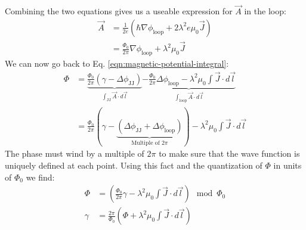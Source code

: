 Combining the two equations gives us a useable expression for $\vec{A}$ in the loop:
\begin{align}
	\vec{A} &= \frac{1}{2e}\left(\hbar \nabla \phi_{\text{loop}} + 2\lambda^2e\mu_0\vec{J} \right) \nonumber \\
	&= \frac{\Phi_0}{2\pi} \nabla \phi_{\text{loop}} + \lambda^2\mu_0\vec{J}
\end{align}
We can now go back to Eq. \ref{eqn:magnetic-potential-integral}:
\begin{align}
	\Phi &= \underbrace{\frac{\Phi_0}{2\pi} \left(\gamma - \Delta\phi_{\text{JJ}}\right)}_{\int_{\text{JJ}}\vec{A} \cdot d\vec{l}} \underbrace{- \frac{\Phi_0}{2\pi}\Delta \phi_{\text{loop}} - \lambda^2\mu_0 \int \vec{J}\cdot d \vec{l}}_{\int_{\text{loop}}\vec{A}\cdot d\vec{l}} \nonumber \\
	&= \frac{\Phi_0}{2\pi} \left(\gamma - \underbrace{\left(\Delta\phi_{\text{JJ}} + \Delta\phi_{\text{loop}}\right)}_{\text{Multiple of } 2\pi} \right) - \lambda^2\mu_0 \int \vec{J}\cdot d \vec{l}
\end{align}
The phase must wind by a multiple of $2\pi$ to make sure that the wave function is uniquely defined at each point. Using this fact and the quantization of $\Phi$ in units of $\Phi_0$ we find:
\begin{align}
	\Phi &= \left(\frac{\Phi_0}{2\pi}\gamma - \lambda^2\mu_0 \int \vec{J}\cdot d \vec{l} \right) \mod \Phi_0 \\ 
	\gamma &= \frac{2\pi}{\Phi_0}\left(\Phi + \lambda^2\mu_0 \int \vec{J}\cdot d \vec{l} \right)
\end{align}

